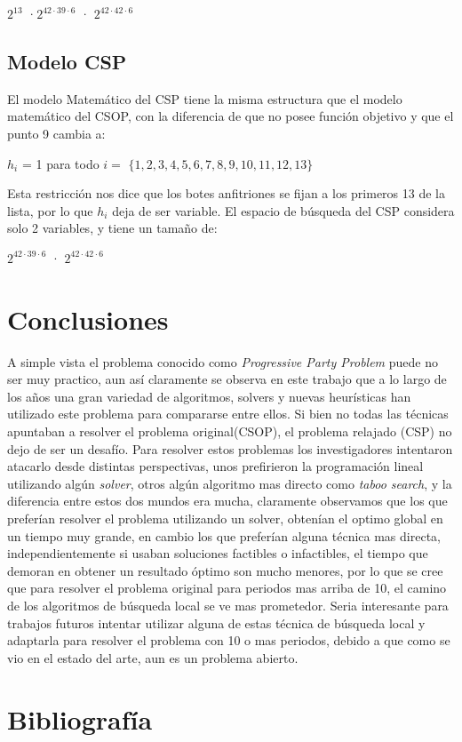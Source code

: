 \documentclass[spanish, fleqn]{article}
\begin{document}
\begin{enumerate}
\begin{center}

$2^{13}$ ·$2^{42 \cdot 39 \cdot 6}$ · $2^{42 \cdot 42 \cdot 6}$

\end{center}

\subsection*{Modelo CSP~\cite{Smith1996}}
El modelo Matemático del CSP tiene la misma estructura que el modelo matemático del CSOP, con la diferencia de que no posee función objetivo y que el punto 9 cambia a:


\begin{center}
$  \mathit{h}_{\mathit{i}}$ = 1 para todo $ \mathit{i} =$ $\{1,2,3,4,5,6,7,8,9,10,11,12,13\}$
\end{center}

Esta restricción nos dice que los botes anfitriones se fijan a los primeros 13 de la lista, por lo que $\mathit{h}_{\mathit{i}}$ deja de ser variable. El espacio de búsqueda del CSP considera solo 2 variables, y tiene un tamaño
 de: 
\begin{center}
$2^{42 \cdot 39 \cdot 6}$ · $2^{42 \cdot 42 \cdot 6}$
\end{center}
\end{enumerate}


\section{Conclusiones}

A simple vista el problema conocido como \textit{Progressive Party Problem} puede no ser muy practico, aun así claramente se observa en este trabajo que a lo largo de los años una gran variedad de algoritmos, solvers y nuevas heurísticas han utilizado este problema para compararse entre ellos. Si bien no todas las técnicas apuntaban a resolver el problema original(CSOP), el problema relajado (CSP) no dejo de ser un desafío. Para resolver estos problemas los investigadores intentaron atacarlo desde distintas perspectivas, unos prefirieron la programación lineal utilizando algún \textit{solver}, otros algún algoritmo mas directo como \textit{taboo search}, y la diferencia entre estos dos mundos era mucha, claramente observamos que los que preferían resolver el problema utilizando un solver, obtenían el optimo global en un tiempo muy grande, en cambio los que preferían alguna técnica mas directa, independientemente si usaban soluciones factibles o infactibles, el tiempo que demoran en obtener un resultado óptimo son mucho menores, por lo que se cree que para resolver el problema original para periodos mas arriba de 10, el camino de los algoritmos de búsqueda local se ve mas prometedor. Seria interesante para trabajos futuros intentar utilizar alguna de estas técnica de búsqueda local y adaptarla para resolver el problema con 10 o mas periodos, debido a que como se vio en el estado del arte, aun es un problema abierto.


\nocite{Brailsford:1996:OSE:241748.241755}

\section{Bibliograf\'ia}



\end{document}
